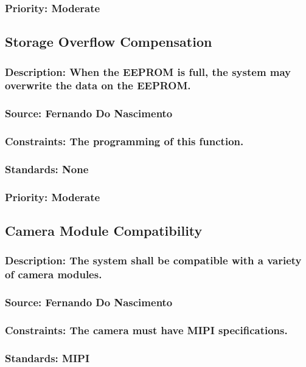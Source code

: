 \subsubsection{Priority: Moderate}

\subsection{Storage Overflow Compensation}
\subsubsection{Description: When the EEPROM is full, the system may overwrite the data on the EEPROM.}
\subsubsection{Source: Fernando Do Nascimento}
\subsubsection{Constraints: The programming of this function.}
\subsubsection{Standards: None}
\subsubsection{Priority: Moderate}

\subsection{Camera Module Compatibility}
\subsubsection{Description: The system shall be compatible with a variety of camera modules.}
\subsubsection{Source: Fernando Do Nascimento}
\subsubsection{Constraints: The camera must have MIPI specifications.}
\subsubsection{Standards: MIPI}
